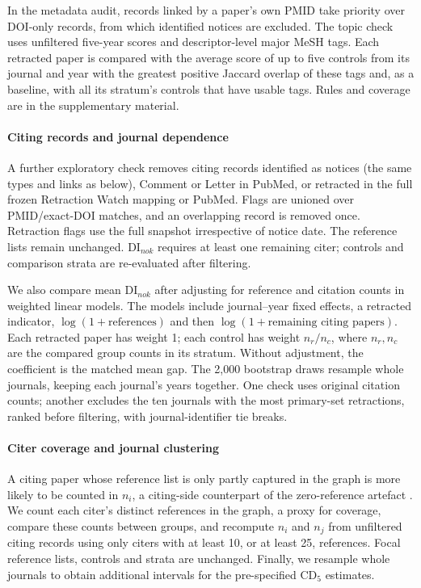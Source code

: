 In the metadata audit, records linked by a paper's own PMID take priority over DOI-only records, from which
identified notices are excluded. The topic check uses unfiltered five-year scores and descriptor-level major MeSH
tags. Each retracted paper is compared with the average score of up to five controls from its journal and year
with the greatest positive Jaccard overlap of these tags and, as a baseline, with all its stratum's controls that
have usable tags. Rules and coverage are in the supplementary material.

\paragraph{Citing records and journal dependence} A further exploratory check removes citing records identified
as notices (the same types and links as below), Comment or Letter in PubMed, or retracted in the full frozen
Retraction Watch mapping or PubMed. Flags are unioned over PMID/exact-DOI matches, and an overlapping record is removed
once. Retraction flags use the full snapshot irrespective of notice date. The reference lists remain unchanged.
DI$_{nok}$ requires at least one remaining citer; controls and comparison strata are re-evaluated after filtering.

We also compare mean DI$_{nok}$ after adjusting for reference and citation counts in weighted linear models.
The models include journal--year fixed effects, a retracted indicator, $\log(1+\text{references})$ and then
$\log(1+\text{remaining citing papers})$. Each retracted paper has weight 1; each control has weight $n_r/n_c$,
where $n_r,n_c$ are the compared group counts in its stratum. Without adjustment, the coefficient is the matched
mean gap. The 2,000 bootstrap draws resample whole journals, keeping each journal's years together.
One check uses original citation counts; another excludes the ten journals with the most primary-set
retractions, ranked before filtering, with journal-identifier tie breaks.

\paragraph{Citer coverage and journal clustering} A citing paper whose reference list is only partly captured in
the graph is more likely to be counted in $n_i$, a citing-side counterpart of the zero-reference artefact
\citep{holst2024artefacts}. We count each citer's distinct references in the graph, a proxy for coverage, compare
these counts between groups, and recompute $n_i$ and $n_j$ from unfiltered citing records using only citers with
at least 10, or at least 25, references. Focal reference lists, controls and strata are unchanged. Finally, we
resample whole journals to obtain additional intervals for the pre-specified CD$_5$ estimates.

